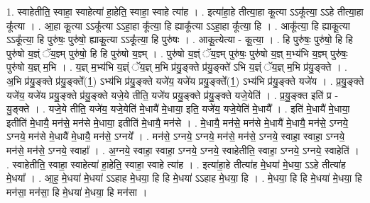 \documentclass[17pt]{extarticle}
\begin{document}
1. स्वाहेतीति॒ स्वाहा॒ स्वाहेत्या॑ हा॒हेति॒ स्वाहा॒ स्वाहे त्या॑ह । . इत्या॑हा॒हे तीत्या॒हा कू॒त्या ऽऽकू᳚त्या॒ ऽऽहे तीत्या॒हा कू᳚त्या । . आ॒हा कू॒त्या ऽऽकू᳚त्या ऽऽहा॒हा कू᳚त्या॒ हि ह्याकू᳚त्या ऽऽहा॒हा कू᳚त्या॒ हि । . आकू᳚त्या॒ हि ह्याकू॒त्या ऽऽकू᳚त्या॒ हि पुरु॑षः॒ पुरु॑षो॒ ह्याकू॒त्या ऽऽकू᳚त्या॒ हि पुरु॑षः । . आकू॒त्येत्या - कू॒त्या॒ । . हि पुरु॑षः॒ पुरु॑षो॒ हि हि पुरु॑षो य॒ज्ञ्ं ॅय॒ज्ञ्म् पुरु॑षो॒ हि हि पुरु॑षो य॒ज्ञ्म् । . पुरु॑षो य॒ज्ञ्ं ॅय॒ज्ञ्म् पुरु॑षः॒ पुरु॑षो य॒ज्ञ् म॒भ्य॑भि य॒ज्ञ्म् पुरु॑षः॒ पुरु॑षो य॒ज्ञ् म॒भि । . य॒ज्ञ् म॒भ्य॑भि य॒ज्ञ्ं ॅय॒ज्ञ् म॒भि प्र॑यु॒ङ्क्ते प्र॑यु॒ङ्क्ते॑ ऽभि य॒ज्ञ्ं ॅय॒ज्ञ् म॒भि प्र॑यु॒ङ्क्ते । . अ॒भि प्र॑यु॒ङ्क्ते प्र॑यु॒ङ्क्ते᳚(1॒) ऽभ्य॑भि प्र॑यु॒ङ्क्ते यजे॑य॒ यजे॑य प्रयु॒ङ्क्ते᳚(1॒) ऽभ्य॑भि प्र॑यु॒ङ्क्ते यजे॑य । . प्र॒यु॒ङ्क्ते यजे॑य॒ यजे॑य प्रयु॒ङ्क्ते प्र॑यु॒ङ्क्ते यजे॒ये तीति॒ यजे॑य प्रयु॒ङ्क्ते प्र॑यु॒ङ्क्ते यजे॒येति॑ । . प्र॒यु॒ङ्क्त इति॑ प्र - यु॒ङ्क्ते । . यजे॒ये तीति॒ यजे॑य॒ यजे॒येति॑ मे॒धायै॑ मे॒धाया॒ इति॒ यजे॑य॒ यजे॒येति॑ मे॒धायै᳚ । . इति॑ मे॒धायै॑ मे॒धाया॒ इतीति॑ मे॒धायै॒ मन॑से॒ मन॑से मे॒धाया॒ इतीति॑ मे॒धायै॒ मन॑से । . मे॒धायै॒ मन॑से॒ मन॑से मे॒धायै॑ मे॒धायै॒ मन॑से॒ ऽग्नये॒ ऽग्नये॒ मन॑से मे॒धायै॑ मे॒धायै॒ मन॑से॒ ऽग्नये᳚ । . मन॑से॒ ऽग्नये॒ ऽग्नये॒ मन॑से॒ मन॑से॒ ऽग्नये॒ स्वाहा॒ स्वाहा॒ ऽग्नये॒ मन॑से॒ मन॑से॒ ऽग्नये॒ स्वाहा᳚ । . अ॒ग्नये॒ स्वाहा॒ स्वाहा॒ ऽग्नये॒ ऽग्नये॒ स्वाहेतीति॒ स्वाहा॒ ऽग्नये॒ ऽग्नये॒ स्वाहेति॑ । . स्वाहेतीति॒ स्वाहा॒ स्वाहेत्या॑ हा॒हेति॒ स्वाहा॒ स्वाहे त्या॑ह । . इत्या॑हा॒हे तीत्या॑ह मे॒धया॑ मे॒धया॒ ऽऽहे तीत्या॑ह मे॒धया᳚ । . आ॒ह॒ मे॒धया॑ मे॒धया॑ ऽऽहाह मे॒धया॒ हि हि मे॒धया॑ ऽऽहाह मे॒धया॒ हि । . मे॒धया॒ हि हि मे॒धया॑ मे॒धया॒ हि मन॑सा॒ मन॑सा॒ हि मे॒धया॑ मे॒धया॒ हि मन॑सा । \newline
\end{document}
